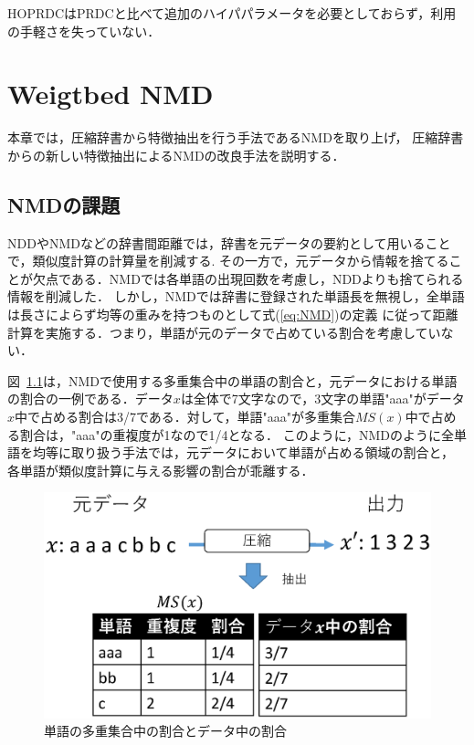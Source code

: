 HOPRDCはPRDCと比べて追加のハイパパラメータを必要としておらず，利用の手軽さを失っていない．

\chapter{Weigtbed NMD} %
本章では，圧縮辞書から特徴抽出を行う手法であるNMDを取り上げ，
圧縮辞書からの新しい特徴抽出によるNMDの改良手法を説明する．
\label{sec:nmdの改良_仮_}
\section{NMDの課題}
NDDやNMDなどの辞書間距離では，辞書を元データの要約として用いることで，類似度計算の計算量を削減する.
その一方で，元データから情報を捨てることが欠点である．NMDでは各単語の出現回数を考慮し，NDDよりも捨てられる情報を削減した．
しかし，NMDでは辞書に登録された単語長を無視し，全単語は長さによらず均等の重みを持つものとして式(\ref{eq:NMD})の定義
に従って距離計算を実施する．つまり，単語が元のデータで占めている割合を考慮していない．

図~\ref{fig:image/NMD_Task.eps}は，NMDで使用する多重集合中の単語の割合と，元データにおける単語の割合の一例である．データ$x$は全体で7文字なので，3文字の単語"aaa"がデータ$x$中で占める割合は3/7である．対して，単語"aaa"が多重集合$MS(x)$中で占める割合は，"aaa"の重複度が1なので1/4となる．
このように，NMDのように全単語を均等に取り扱う手法では，元データにおいて単語が占める領域の割合と，
各単語が類似度計算に与える影響の割合が乖離する．

\begin{figure}[tb]
\begin{center}
\includegraphics[clip, width=\columnwidth]{image/NMD_Task.eps}
\caption{単語の多重集合中の割合とデータ中の割合}
\label{fig:image/NMD_Task.eps}
\end{center}
\end{figure}

